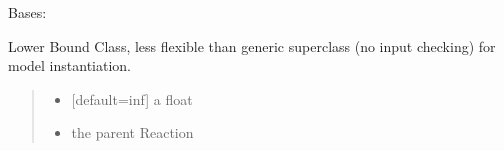 \documentclass[letterpaper,12pt,english]{sphinxmanual}
\begin{document}
\begin{fulllineitems}
\label{\detokenize{api/core:cbmpy.CBModel.FluxBoundLower}}
\pysigstartsignatures
\pysiglinewithargsret
{}
{\sphinxparamcomma {}}
{}
\pysigstopsignatures
\sphinxAtStartPar
Bases: {\hyperref[\detokenize{api/core:cbmpy.CBModel.FluxBoundBase}]{}}

\begin{fulllineitems}
\label{\detokenize{api/core:cbmpy.CBModel.FluxBoundLower.__init__}}
\pysigstartsignatures
\pysiglinewithargsret
{}
{\sphinxparamcomma {}}
{}
\pysigstopsignatures
\sphinxAtStartPar
Lower Bound Class, less flexible than generic superclass (no input checking) for model instantiation.
\begin{quote}\begin{description}
\begin{itemize}
\item {} 
\sphinxAtStartPar
{} \textendash{} {[}default=\sphinxhyphen{}inf{]} a float

\item {} 
\sphinxAtStartPar
{} \textendash{} the parent Reaction

\end{itemize}

\end{description}\end{quote}

\end{fulllineitems}


\end{fulllineitems}

\end{document}
